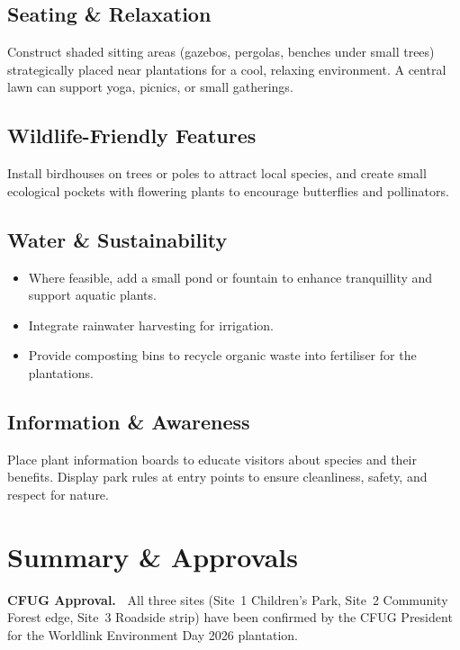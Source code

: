 \documentclass[11pt,a4paper]{article}
\newenvironment{notebox}[1][Note]{%
  \par\medskip\noindent\textbf{#1.~}\ignorespaces}{\par\medskip}
\begin{document}
\subsection{Seating \& Relaxation}
Construct shaded sitting areas (gazebos, pergolas, benches under small trees) strategically placed near plantations for a cool, relaxing environment. A central lawn can support yoga, picnics, or small gatherings.

\subsection{Wildlife-Friendly Features}
Install birdhouses on trees or poles to attract local species, and create small ecological pockets with flowering plants to encourage butterflies and pollinators.

\subsection{Water \& Sustainability}
\begin{itemize}
  \item Where feasible, add a small pond or fountain to enhance tranquillity and support aquatic plants.
  \item Integrate rainwater harvesting for irrigation.
  \item Provide composting bins to recycle organic waste into fertiliser for the plantations.
\end{itemize}

\subsection{Information \& Awareness}
Place plant information boards to educate visitors about species and their benefits. Display park rules at entry points to ensure cleanliness, safety, and respect for nature.

\section{Summary \& Approvals}
\label{sec:summary}

\begin{notebox}[CFUG Approval]
All three sites (Site~1 Children's Park, Site~2 Community Forest edge, Site~3 Roadside strip) have been confirmed by the CFUG President for the Worldlink Environment Day 2026 plantation.
\end{notebox}
\end{document}
